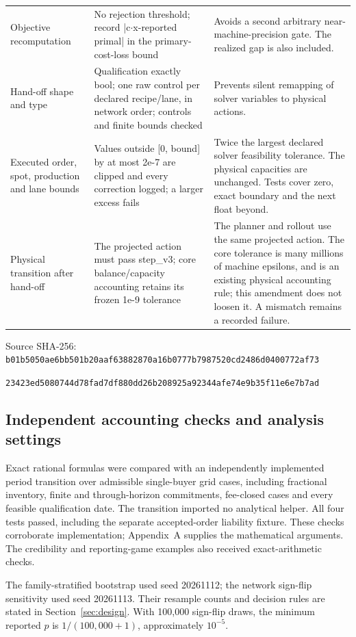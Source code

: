 \documentclass[preprint,11pt,authoryear]{elsarticle}
\newif\ifprovenance\provenancetrue
\begin{document}
\begin{longtable}{>{\raggedright\arraybackslash}p{3.0cm}>{\raggedright\arraybackslash}p{5.3cm}>{\raggedright\arraybackslash}p{6.2cm}}
Objective recomputation & No rejection threshold; record |c\ensuremath{\cdot}x-reported primal| in the primary-cost-loss bound & Avoids a second arbitrary near-machine-precision gate. The realized gap is also included. \\
Hand-off shape and type & Qualification exactly bool; one raw control per declared recipe/lane, in network order; controls and finite bounds checked & Prevents silent remapping of solver variables to physical actions. \\
Executed order, spot, production and lane bounds & Values outside [0, bound] by at most 2e-7 are clipped and every correction logged; a larger excess fails & Twice the largest declared solver feasibility tolerance. The physical capacities are unchanged. Tests cover zero, exact boundary and the next float beyond. \\
Physical transition after hand-off & The projected action must pass step\_v3; core balance/capacity accounting retains its frozen 1e-9 tolerance & The planner and rollout use the same projected action. The core tolerance is many millions of machine epsilons, and is an existing physical accounting rule; this amendment does not loosen it. A mismatch remains a recorded failure. \\
\end{longtable}
\ifprovenance\noindent\scriptsize Source SHA-256: \texttt{b01b5050ae6bb501b20aaf63882870a16b0777b7987520cd2486d0400772af73}\par \texttt{23423ed5080744d78fad7df880dd26b208925a92344afe74e9b35f11e6e7b7ad}\par\fi
\endgroup


\subsection{Independent accounting checks and analysis settings}
Exact rational formulas were compared with an independently implemented period transition over  admissible single-buyer grid cases, including fractional inventory, finite and through-horizon commitments, fee-closed cases and every feasible qualification date. The transition imported no analytical helper. All four tests passed, including the separate accepted-order liability fixture. These checks corroborate implementation; Appendix~A supplies the mathematical arguments. The credibility and reporting-game examples also received exact-arithmetic checks.

The family-stratified bootstrap used seed 20261112; the network sign-flip sensitivity used seed 20261113. Their resample counts and decision rules are stated in Section~\ref{sec:design}. With 100,000 sign-flip draws, the minimum reported $p$ is $1/(100{,}000+1)$, approximately $10^{-5}$.
\end{document}
